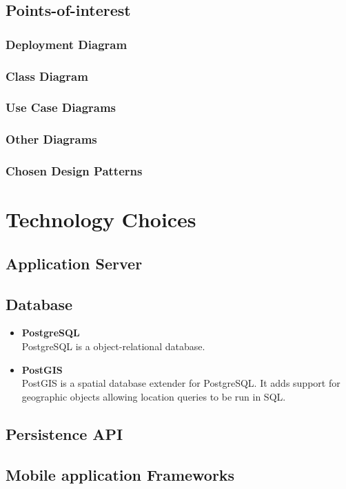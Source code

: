 \documentclass{article}
\begin{document}
    \subsection{Points-of-interest}
        \subsubsection{Deployment Diagram}
        \subsubsection{Class Diagram}
        \subsubsection{Use Case Diagrams}
        \subsubsection{Other Diagrams}
        \subsubsection{Chosen Design Patterns}
\section{Technology Choices}
\subsection{Application Server}

\subsection{Database}
\begin{itemize}
	\item \textbf{PostgreSQL} \\
	PostgreSQL is a object-relational database. 

	\item \textbf{PostGIS} \\
	PostGIS is a spatial database extender for PostgreSQL. It adds support for geographic objects allowing location queries to be run in SQL.
\end{itemize}

\subsection{Persistence API}
\subsection{Mobile application Frameworks}
	
\end{document}
